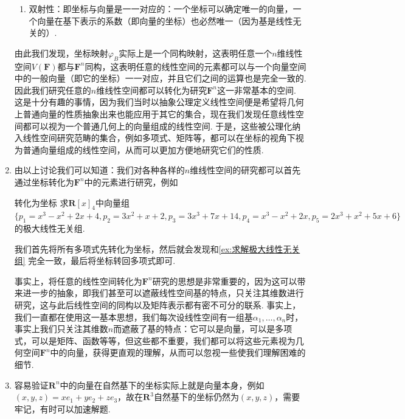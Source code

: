 \begin{enumerate}
\begin{enumerate}
              \item 双射性：即坐标与向量是一一对应的：一个坐标可以确定唯一的向量，一个向量在基下表示的系数（即向量的坐标）也必然唯一（因为基是线性无关的）.
          \end{enumerate}
          由此我们发现，坐标映射$\varphi_B$实际上是一个同构映射，这表明任意一个$n$维线性空间$V(\mathbf{F})$都与$\mathbf{F}^n$同构，这表明任意的线性空间的元素都可以与一个向量空间中的一般向量（即它的坐标）一一对应，并且它们之间的运算也是完全一致的. 因此我们研究任意的$n$维线性空间都可以转化为研究$\mathbf{F}^n$这一非常基本的空间. 这是十分有趣的事情，因为我们当时以抽象公理定义线性空间便是希望将几何上普通向量的性质抽象出来也能应用于其它的集合，现在我们发现任意线性空间都可以视为一个普通几何上的向量组成的线性空间. 于是，这些被公理化纳入线性空间研究范畴的集合，例如多项式、矩阵等，都可以在坐标的视角下视为普通向量组成的线性空间，从而可以更加方便地研究它们的性质.

    \item 由以上讨论我们可以知道：我们对各种各样的$n$维线性空间的研究都可以首先通过坐标转化为$\mathbf{F}^n$中的元素进行研究，例如
          \begin{example}{}{转化为坐标}
              求$\mathbf{R}[x]_4$中向量组$\{p_1=x^3-x^2+2x+4,p_2=3x^2+x+2,p_3=3x^3+7x+14,p_4=x^3-x^2+2x,p_5=2x^3+x^2+5x+6\}$的极大线性无关组.
          \end{example}
          \begin{solution}
              我们首先将所有多项式先转化为坐标，然后就会发现和\autoref{ex:求解极大线性无关组} 完全一致，最后将坐标转回多项式即可.
          \end{solution}

          事实上，将任意的线性空间转化为$\mathbf{F}^n$研究的思想是非常重要的，因为这可以带来进一步的抽象，即我们甚至可以遮蔽线性空间基的特点，只关注其维数进行研究，这与此后线性空间的同构以及矩阵表示都有密不可分的联系. 事实上，我们一直都在使用这一基本思想，我们每次设线性空间有一组基$\alpha_1,\ldots,\alpha_n$时，事实上我们只关注其维数$n$而遮蔽了基的特点：它可以是向量，可以是多项式，可以是矩阵、函数等等，但这些都不重要，我们都可以将这些元素视为几何空间$\mathbf{F}^n$中的向量，获得更直观的理解，从而可以忽视一些使我们理解困难的细节.

    \item 容易验证$\mathbf{R}^n$中的向量在自然基下的坐标实际上就是向量本身，例如$(x,y,z)=xe_1+ye_2+ze_3$，故在$\mathbf{R}^3$自然基下的坐标仍然为$(x,y,z)$，需要牢记，有时可以加速解题.
\end{enumerate}

